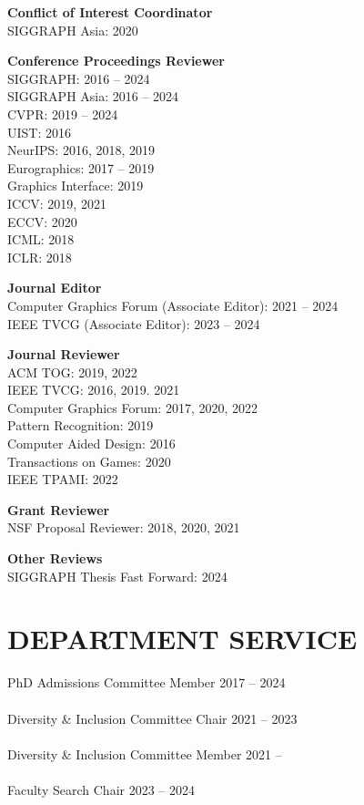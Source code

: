 \documentclass[line,margin]{res}
\begin{document}
\begin{resume}
\textbf{Conflict of Interest Coordinator}\\
SIGGRAPH Asia: 2020

\textbf{Conference Proceedings Reviewer}\\
SIGGRAPH: 2016 -- 2024\\
SIGGRAPH Asia: 2016 -- 2024\\
CVPR: 2019 -- 2024\\
UIST: 2016\\
NeurIPS: 2016, 2018, 2019\\
Eurographics: 2017 --  2019\\
Graphics Interface: 2019\\
ICCV: 2019, 2021\\
ECCV: 2020\\
ICML: 2018\\
ICLR: 2018

\textbf{Journal Editor}\\
Computer Graphics Forum (Associate Editor): 2021 -- 2024\\
IEEE TVCG (Associate Editor): 2023 -- 2024

\textbf{Journal Reviewer}\\
ACM TOG: 2019, 2022\\
IEEE TVCG: 2016, 2019. 2021\\
Computer Graphics Forum: 2017, 2020, 2022\\
Pattern Recognition: 2019\\
Computer Aided Design: 2016\\
Transactions on Games: 2020\\
IEEE TPAMI: 2022

\textbf{Grant Reviewer}\\
NSF Proposal Reviewer: 2018, 2020, 2021

\textbf{Other Reviews}\\
SIGGRAPH Thesis Fast Forward: 2024


\section{DEPARTMENT SERVICE}

PhD Admissions Committee Member \hfill 2017 -- 2024
\\ \\
Diversity \& Inclusion Committee Chair \hfill 2021 -- 2023
\\ \\
Diversity \& Inclusion Committee Member \hfill 2021 -- 
\\ \\
Faculty Search Chair \hfill 2023 -- 2024


\end{resume}
\end{document}
